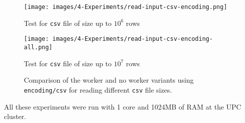 \begin{figure}[H]
  \centering
  \begin{minipage}{0.49\textwidth}
    \centering
    \texttt{[image: images/4-Experiments/read-input-csv-encoding.png]}
    \caption*{Test for \texttt{csv} file of size up to $10^6$ rows}
  \end{minipage}
  \hfill
  \begin{minipage}{0.49\textwidth}
    \centering
    \texttt{[image: images/4-Experiments/read-input-csv-encoding-all.png]}
    \caption*{Test for \texttt{csv} file of size up to $10^7$ rows}
  \end{minipage}
    \caption{Comparison of the worker and no worker variants using \texttt{encoding/csv} for reading different \texttt{csv} file sizes.}
    \label{img:exps-csv-encoding-variants}
\end{figure}

All these experiments were run with 1 core and 1024MB of RAM at the UPC cluster.
%

